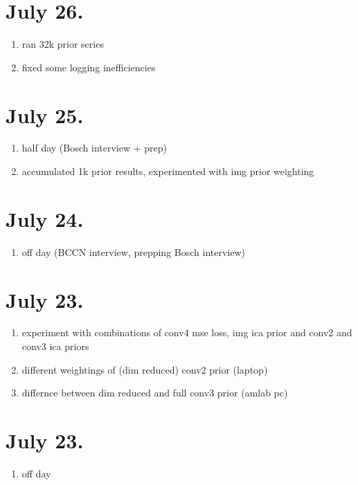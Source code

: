 \documentclass{article}
\begin{document}
\section*{July 26.}

\begin{enumerate}
	\item ran 32k prior series
	\item fixed some logging inefficiencies
\end{enumerate}


\section*{July 25.}

\begin{enumerate}
	\item half day (Bosch interview + prep)
	\item accumulated 1k prior results, experimented with img prior weighting
\end{enumerate}


\section*{July 24.}

\begin{enumerate}
	\item off day (BCCN interview, prepping Bosch interview)
\end{enumerate}

\section*{July 23.}

\begin{enumerate}
	\item experiment with combinations of conv4 mse loss, img ica prior and conv2 and conv3 ica priors
	\item different weightings of (dim reduced) conv2 prior (laptop)
	\item differnce between dim reduced and full conv3 prior (amlab pc)
\end{enumerate}

\section*{July 23.}

\begin{enumerate}
	\item off day
\end{enumerate}
\end{document}

